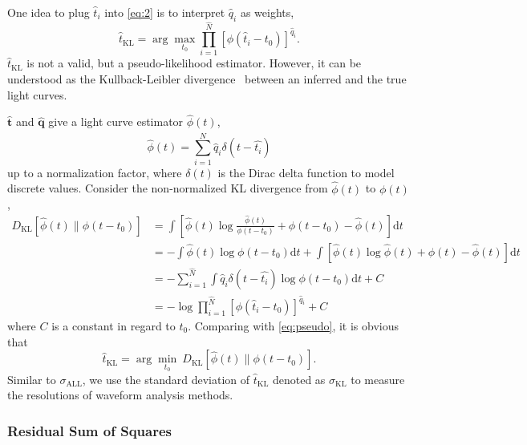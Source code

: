 One idea to plug $\hat{t}_i$ into \eqref{eq:2} is to interpret $\hat{q}_i$ as weights,
\begin{equation}
  \label{eq:pseudo}
  \hat{t}_\mathrm{KL} = \arg\underset{t_0}{\max} \prod_{i=1}^{\hat{N}} \left[\phi(\hat{t}_i-t_0)\right]^{\hat{q}_i}.
\end{equation}
$\hat{t}_\mathrm{KL}$ is not a valid, but a pseudo-likelihood estimator. However, it can be understood as the Kullback-Leibler divergence~\cite{kullback_information_1951} between an inferred and the true light curves.

$\bm{\hat{t}}$ and $\bm{\hat{q}}$ give a light curve estimator $\hat{\phi}(t)$,
\begin{equation}
  \label{eq:lc}
  \hat{\phi}(t) = \sum_{i=1}^{\hat{N}} \hat{q}_i\delta(t-\hat{t_i})
\end{equation}
up to a normalization factor, where $\delta(t)$ is the Dirac delta function to model discrete values.  Consider the non-normalized KL divergence from $\hat{\phi}(t)$ to $\phi(t)$,
\begin{equation}
  \begin{aligned}
    D_\mathrm{KL}\left[\hat{\phi}(t) \parallel \phi(t-t_0)\right] & =\int \left[\hat{\phi}(t) \log\frac{\hat{\phi}(t)}{\phi(t-t_0)} + \phi(t-t_0) - \hat{\phi}(t) \right]\mathrm{d}t \\
    & = - \int \hat{\phi}(t) \log\phi(t-t_0)\mathrm{d}t + \int \left[\hat{\phi}(t) \log\hat{\phi}(t) + \phi(t) - \hat{\phi}(t) \right]\mathrm{d}t \\
    & = - \sum_{i=1}^{\hat{N}}\int \hat{q}_i\delta(t-\hat{t_i}) \log\phi(t-t_0)\mathrm{d}t + C \\
    & = -\log \prod_{i=1}^{\hat{N}} \left[\phi(\hat{t}_i-t_0)\right]^{\hat{q}_i} + C
  \label{eq:kl}
  \end{aligned}
\end{equation}
where $C$ is a constant in regard to $t_0$.  Comparing with \eqref{eq:pseudo}, it is obvious that
\begin{equation}
  \label{eq:kl2}
  \hat{t}_\mathrm{KL} = \arg\underset{t_0}{\min}~D_\mathrm{KL}\left[\hat{\phi}(t) \parallel \phi(t-t_0)\right].
\end{equation}
Similar to $\sigma_\mathrm{ALL}$, we use the standard deviation of $\hat{t}_\mathrm{KL}$ denoted as $\sigma_\mathrm{KL}$ to measure the resolutions of waveform analysis methods.

\subsubsection{Residual Sum of Squares}
\label{sec:rss}

